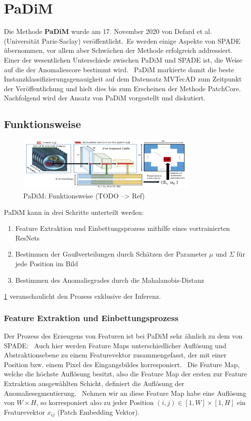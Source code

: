 \section{PaDiM}\label{sec:PaDiM}
Die Methode \textbf{PaDiM} wurde am 17. November 2020 von Defard et al. (Universität Paris-Saclay) veröffentlicht.\
Es werden einige Aspekte von SPADE übernommen, vor allem aber Schwächen der Methode erfolgreich addressiert. Einer der wesentlichen Unterschiede zwischen PaDiM und SPADE ist, die Weise auf die der Anomaliescore bestimmt wird. \ 
PaDiM markierte damit die beste Instanzklassifizierungsgenauigkeit auf dem Datensatz MVTecAD zum Zeitpunkt der Veröffentlichung und hielt dies bis zum Erscheinen der Methode \glqq PatchCore\grqq{}.
Nachfolgend wird der Ansatz von PaDiM vorgestellt und diskutiert.\
\subsection{Funktionsweise}\label{subsec:PaDiMFunktionsweise}
\begin{figure}[H]
  \centering
  \includegraphics[width=0.8\textwidth]{bilder/padim.png}
  \caption{PaDiM: Funktionsweise (TODO --> Ref)}
  \label{fig:PaDiMOverview}
\end{figure}
PaDiM kann in drei Schritte unterteilt werden: \
\begin{enumerate}
  \item Feature Extraktion und Einbettungsprozess mithilfe eines vortrainierten ResNets
  \item Bestimmen der Gaußverteilungen durch Schätzen der Parameter $\mu$ und $\Sigma$ für jede Position im Bild
  \item Bestimmen des Anomaliegrades durch die Mahalanobis-Distanz
\end{enumerate}
\ref{fig:PaDiMOverview} veranschaulicht den Prozess exklusive der Inferenz. \
\subsubsection*{Feature Extraktion und Einbettungsprozess}
Der Prozess des Erzeugens von Featuren ist bei PaDiM sehr ähnlich zu dem von SPADE: \
Auch hier werden Feature Maps unterschiedlicher Auflösung und Abstraktionsebene zu einem Featurevektor zusammengefasst, der mit einer Position bzw. einem Pixel des Eingangsbildes korresponiert. \
Die Feature Map, welche die höchste Auflösung besitzt, also die Feature Map der ersten zur Feature Extraktion ausgewählten Schicht, definiert die Auflösung der Anomaliesegmentierung. \
Nehmen wir an diese Feature Map habe eine Auflösung von $W\times H$, so korresponiert also zu jeder Position $(i,j)\in [1,W]\times[1,H]$ ein Featurevektor $x_{ij}$ (\glqq Patch Embedding Vektor\grqq{}). \\
